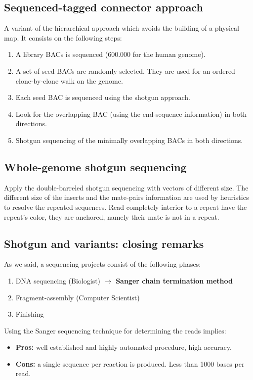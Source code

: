\subsection{Sequenced-tagged connector approach}
A variant of the hierarchical approach which avoids the building of a physical map. It consists on the following steps:
\begin{enumerate}
	\item A library BACs is sequenced (600.000 for the human genome).
	\item A set of seed BACs are randomly selected. They are used for an ordered clone-by-clone walk on the genome. 
	\item Each seed BAC is sequenced using the shotgun approach.
	\item Look for the overlapping BAC (using the end-sequence information) in both directions.
	\item Shotgun sequencing of the minimally overlapping BACs in both directions.
\end{enumerate}

\subsection{Whole-genome shotgun sequencing}
Apply the double-barreled shotgun sequencing with vectors of different size. The different size of the inserts and the mate-pairs information are used by heuristics to resolve the repeated sequences. Read completely interior to a repeat have the repeat's color, they are anchored, namely their mate is not in a repeat.

\subsection{Shotgun and variants: closing remarks}
As we said, a sequencing projects consist of the following phases:
\begin{enumerate}
	\item DNA sequencing (Biologist) $\rightarrow$ \textbf{Sanger chain termination method}
	\item Fragment-assembly (Computer Scientist)
	\item Finishing
\end{enumerate}
Using the Sanger sequencing technique for determining the reads implies:
\begin{itemize}
	\item \textbf{Pros:} well established and highly automated procedure, high accuracy.
	\item \textbf{Cons:} a single sequence per reaction is produced. Less than 1000 bases per read.
\end{itemize}

